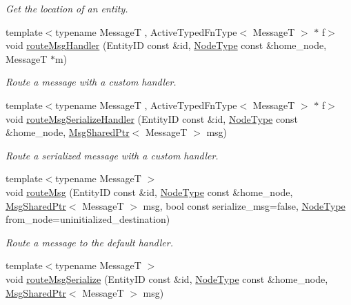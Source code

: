 \begin{DoxyCompactItemize}
\begin{DoxyCompactList}\small\item\em Get the location of an entity. \end{DoxyCompactList}\item 
{\footnotesize template$<$typename MessageT , Active\+Typed\+Fn\+Type$<$ Message\+T $>$ $\ast$ f$>$ }\\void \hyperlink{structvt_1_1location_1_1_entity_location_coord_a0432bf605db83627c15e2c53920aff97}{route\+Msg\+Handler} (Entity\+ID const \&id, \hyperlink{namespacevt_a866da9d0efc19c0a1ce79e9e492f47e2}{Node\+Type} const \&home\+\_\+node, MessageT $\ast$m)
\begin{DoxyCompactList}\small\item\em Route a message with a custom handler. \end{DoxyCompactList}\item 
{\footnotesize template$<$typename MessageT , Active\+Typed\+Fn\+Type$<$ Message\+T $>$ $\ast$ f$>$ }\\void \hyperlink{structvt_1_1location_1_1_entity_location_coord_ad0465263fbb33cf63819fd2c86f10cec}{route\+Msg\+Serialize\+Handler} (Entity\+ID const \&id, \hyperlink{namespacevt_a866da9d0efc19c0a1ce79e9e492f47e2}{Node\+Type} const \&home\+\_\+node, \hyperlink{namespacevt_ab2b3d506ec8e8d1540aede826d84a239}{Msg\+Shared\+Ptr}$<$ MessageT $>$ msg)
\begin{DoxyCompactList}\small\item\em Route a serialized message with a custom handler. \end{DoxyCompactList}\item 
{\footnotesize template$<$typename MessageT $>$ }\\void \hyperlink{structvt_1_1location_1_1_entity_location_coord_adead0cbbf14cc160034b55abfa5b9ca0}{route\+Msg} (Entity\+ID const \&id, \hyperlink{namespacevt_a866da9d0efc19c0a1ce79e9e492f47e2}{Node\+Type} const \&home\+\_\+node, \hyperlink{namespacevt_ab2b3d506ec8e8d1540aede826d84a239}{Msg\+Shared\+Ptr}$<$ MessageT $>$ msg, bool const serialize\+\_\+msg=false, \hyperlink{namespacevt_a866da9d0efc19c0a1ce79e9e492f47e2}{Node\+Type} from\+\_\+node=uninitialized\+\_\+destination)
\begin{DoxyCompactList}\small\item\em Route a message to the default handler. \end{DoxyCompactList}\item 
{\footnotesize template$<$typename MessageT $>$ }\\void \hyperlink{structvt_1_1location_1_1_entity_location_coord_a1a1d8dfa9ac9fdceadb5c2ef9b9cecb6}{route\+Msg\+Serialize} (Entity\+ID const \&id, \hyperlink{namespacevt_a866da9d0efc19c0a1ce79e9e492f47e2}{Node\+Type} const \&home\+\_\+node, \hyperlink{namespacevt_ab2b3d506ec8e8d1540aede826d84a239}{Msg\+Shared\+Ptr}$<$ MessageT $>$ msg)

\end{DoxyCompactItemize}
